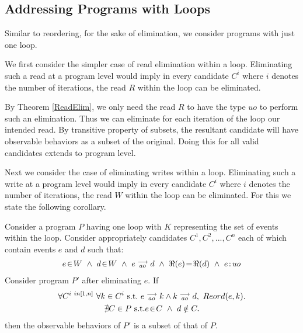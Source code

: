 \subsection{Addressing Programs with Loops}
    
        Similar to reordering, for the sake of elimination, we consider programs with just one loop. 
        
        We first consider the simpler case of read elimination within a loop. 
        Eliminating such a read at a program level would imply in every candidate $C^i$ where $i$ denotes the number of iterations, the read $R$ within the loop can be eliminated.
        
        By Theorem \ref{ReadElim}, we only need the read $R$ to have the type $uo$ to perform such an elimination.
        Thus we can eliminate for each iteration of the loop our intended read. 
        By transitive property of subsets, the resultant candidate will have observable behaviors as a subset of the original. 
        Doing this for all valid candidates extends to program level.

        Next we consider the case of eliminating writes within a loop. 
        Eliminating such a write at a program level would imply in every candidate $C^i$ where $i$ denotes the number of iterations, the read $W$ within the loop can be eliminated.
        For this we state the following corollary.
        \begin{corollary}
            Consider a program $P$ having one loop with $K$ representing the set of events within the loop. Consider appropriately candidates $C^1, C^2, ... , C^n$ each of which contain events $e$ and $d$ such that:
            \begin{align*}
                \event{e}{W} \ \wedge \ \event{d}{W} \ \wedge \ \reln{e}{ao}{d} \ \wedge \ \Re(e)\!=\!\Re(d) \ \wedge \ \et{e}{uo}
            \end{align*}
            Consider program $P'$ after eliminating $e$. 
            If
            \begin{gather*}
                  \forall C^{i \ in [1,n]} \ \forall k \in C^i \ \text{s.t.} \ \reln{e}{ao}{k} \wedge \reln{k}{ao}{d}, \ Reord(e,k). \\ 
                  \nexists C \in P \ \text{s.t.} \event{e}{C} \ \wedge \  d \notin C.
            \end{gather*}
            then the observable behaviors of $P'$ is a subset of that of $P$. 
        \end{corollary}

